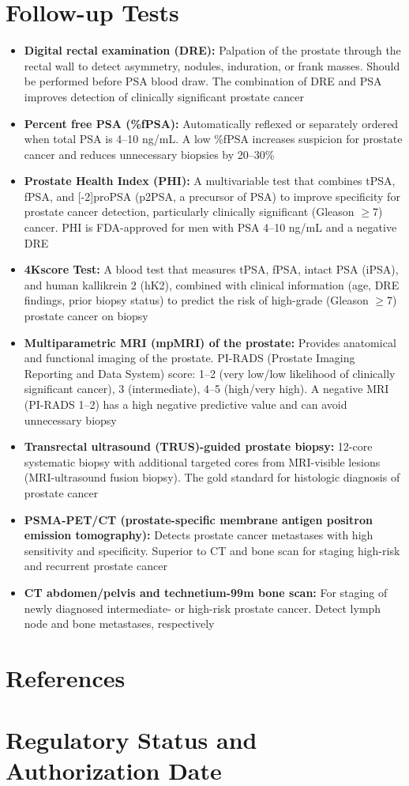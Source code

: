 \section*{Follow-up Tests}
\begin{itemize}
  \item \textbf{Digital rectal examination (DRE):} Palpation of the prostate through the rectal wall to detect asymmetry, nodules, induration, or frank masses. Should be performed before PSA blood draw. The combination of DRE and PSA improves detection of clinically significant prostate cancer
  \item \textbf{Percent free PSA (\%fPSA):} Automatically reflexed or separately ordered when total PSA is 4--10 ng/mL. A low \%fPSA increases suspicion for prostate cancer and reduces unnecessary biopsies by 20--30\%
  \item \textbf{Prostate Health Index (PHI):} A multivariable test that combines tPSA, fPSA, and [-2]proPSA (p2PSA, a precursor of PSA) to improve specificity for prostate cancer detection, particularly clinically significant (Gleason $\geq$7) cancer. PHI is FDA-approved for men with PSA 4--10 ng/mL and a negative DRE
  \item \textbf{4Kscore Test:} A blood test that measures tPSA, fPSA, intact PSA (iPSA), and human kallikrein 2 (hK2), combined with clinical information (age, DRE findings, prior biopsy status) to predict the risk of high-grade (Gleason $\geq$7) prostate cancer on biopsy
  \item \textbf{Multiparametric MRI (mpMRI) of the prostate:} Provides anatomical and functional imaging of the prostate. PI-RADS (Prostate Imaging Reporting and Data System) score: 1--2 (very low/low likelihood of clinically significant cancer), 3 (intermediate), 4--5 (high/very high). A negative MRI (PI-RADS 1--2) has a high negative predictive value and can avoid unnecessary biopsy
  \item \textbf{Transrectal ultrasound (TRUS)-guided prostate biopsy:} 12-core systematic biopsy with additional targeted cores from MRI-visible lesions (MRI-ultrasound fusion biopsy). The gold standard for histologic diagnosis of prostate cancer
  \item \textbf{PSMA-PET/CT (prostate-specific membrane antigen positron emission tomography):} Detects prostate cancer metastases with high sensitivity and specificity. Superior to CT and bone scan for staging high-risk and recurrent prostate cancer
  \item \textbf{CT abdomen/pelvis and technetium-99m bone scan:} For staging of newly diagnosed intermediate- or high-risk prostate cancer. Detect lymph node and bone metastases, respectively
\end{itemize}

\section*{References}



\clearpage
\section*{Regulatory Status and Authorization Date}

\clearpage
